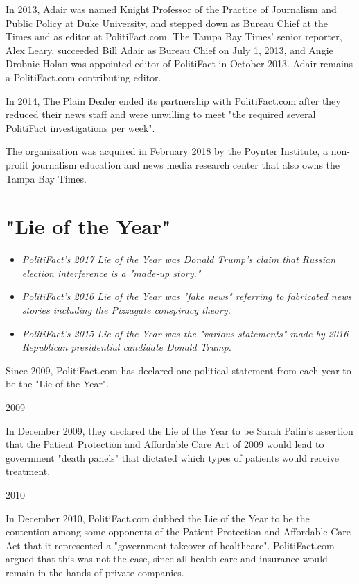 In 2013, Adair was named Knight Professor of the Practice of Journalism
and Public Policy at Duke University, and stepped down as Bureau Chief
at the Times and as editor at PolitiFact.com. The Tampa Bay Times'
senior reporter, Alex Leary, succeeded Bill Adair as Bureau Chief on
July 1, 2013, and Angie Drobnic Holan was appointed editor of PolitiFact
in October 2013. Adair remains a PolitiFact.com contributing editor.

In 2014, The Plain Dealer ended its partnership with PolitiFact.com
after they reduced their news staff and were unwilling to meet "the
required several PolitiFact investigations per week".

The organization was acquired in February 2018 by the Poynter Institute,
a non-profit journalism education and news media research center that
also owns the Tampa Bay Times.

\section{"Lie of the Year"}\label{lie-of-the-year}

\begin{itemize}
\item
  \emph{PolitiFact's 2017 Lie of the Year was Donald Trump's claim that
  Russian election interference is a "made-up story."}
\item
  \emph{PolitiFact's 2016 Lie of the Year was "fake news" referring to
  fabricated news stories including the Pizzagate conspiracy theory.}
\item
  \emph{PolitiFact's 2015 Lie of the Year was the "various statements"
  made by 2016 Republican presidential candidate Donald Trump.}
\end{itemize}

Since 2009, PolitiFact.com has declared one political statement from
each year to be the "Lie of the Year".

2009

In December 2009, they declared the Lie of the Year to be Sarah Palin's
assertion that the Patient Protection and Affordable Care Act of 2009
would lead to government "death panels" that dictated which types of
patients would receive treatment.

2010

In December 2010, PolitiFact.com dubbed the Lie of the Year to be the
contention among some opponents of the Patient Protection and Affordable
Care Act that it represented a "government takeover of healthcare".
PolitiFact.com argued that this was not the case, since all health care
and insurance would remain in the hands of private companies.

